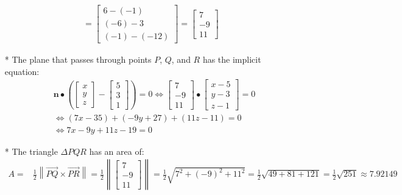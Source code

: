 \documentclass{article}
\begin{document}
\begin{itemize}
\begin{align*}
= \begin{bmatrix} 6 - (-1) \\ (-6) - 3 \\ (-1) - (-12) \end{bmatrix} 
= \begin{bmatrix} 7 \\ -9 \\ 11 \end{bmatrix}  
\end{align*}   
\item[*] The plane that passes through points \(P\), \(Q\), and \(R\) has the implicit equation:
\begin{align*}
& \mathbf{n} \bullet \left(\begin{bmatrix} x \\ y \\ z \end{bmatrix} - \begin{bmatrix} 5 \\ 3 \\ 1 \end{bmatrix}\right) = 0 
\iff \begin{bmatrix} 7 \\ -9 \\ 11 \end{bmatrix} \bullet \begin{bmatrix} x - 5 \\ y - 3 \\ z - 1 \end{bmatrix} = 0 \\
& \iff (7x - 35) + (-9y + 27) + (11z - 11) = 0 \\ 
& \iff 7x - 9y + 11z - 19 = 0
\end{align*}   
\item[*] The triangle \(\Delta PQR\) has an area of:   
\begin{align*}
A = & \frac{1}{2}\left\|\overrightarrow{PQ} \times \overrightarrow{PR}\right\|  
= \frac{1}{2}\left\|\begin{bmatrix} 7 \\ -9 \\ 11 \end{bmatrix} \right\| 
= \frac{1}{2}\sqrt{7^2 + (-9)^2 + 11^2} 
= \frac{1}{2}\sqrt{49 + 81 + 121} = \frac{1}{2}\sqrt{251} \approx 7.92149
\end{align*}
\end{itemize}
\end{document}
